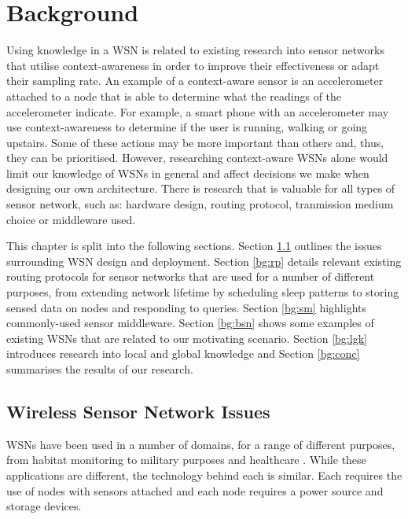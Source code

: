 \chapter{Background}\label{chap:bg}
Using knowledge in a WSN is related to existing research into sensor networks that utilise context-awareness in order to improve their effectiveness or adapt their sampling rate. An example of a context-aware sensor is an accelerometer attached to a node that is able to determine what the readings of the accelerometer indicate. For example, a smart phone with an accelerometer may use context-awareness to determine if the user is running, walking or going upstairs. Some of these actions may be more important than others and, thus, they can be prioritised. However, researching context-aware WSNs alone would limit our knowledge of WSNs in general and affect decisions we make when designing our own architecture. There is research that is valuable for all types of sensor network, such as: hardware design, routing protocol, tranmission medium choice or middleware used.

This chapter is split into the following sections. Section \ref{bg:wsni} outlines the issues surrounding WSN design and deployment. 
Section \ref{bg:rp} details relevant existing routing protocols for sensor networks that are used for a number of different purposes, from extending network lifetime by scheduling sleep patterns to storing sensed data on nodes and responding to queries. Section \ref{bg:sm} highlights commonly-used sensor middleware. Section \ref{bg:bsn} shows some examples of existing WSNs that are related to our motivating scenario.  Section \ref{bg:lgk} introduces research into local and global knowledge and Section \ref{bg:conc} summarises the results of our research.

\section{Wireless Sensor Network Issues} \label{bg:wsni}

WSNs have been used in a number of domains, for a range of different purposes, from habitat monitoring \cite{Szewczyk2004a} to military purposes \cite{Pizzocaro} and healthcare \cite{Otto2006}. While these applications are different, the technology behind each is similar. Each requires the use of nodes with sensors attached and each node requires a power source and storage devices.

